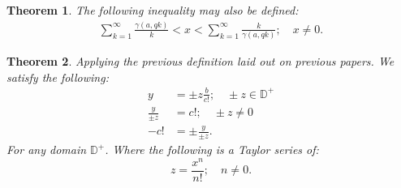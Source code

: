 \documentclass[10pt]{article}
\theoremstyle{plain}
\newtheorem{theorem}{Theorem}[section]
\theoremstyle{definition}
\theoremstyle{remark}
\begin{document}
	\begin{theorem}
		The following inequality may also be defined:
		\begin{align*}
			\sum_{k=1}^{\infty} \frac{\gamma(a, qk)}{k} < x < \sum_{k=1}^{\infty} \frac{k}{\gamma(a, qk)}; \quad x \neq 0.
		\end{align*}
	\end{theorem}
	
	\begin{theorem}
		Applying the previous definition laid out on previous papers. We satisfy the following:
		\begin{align*}
			y &= \pm z \frac{b}{c!}; \quad \pm z \in \mathbb{D}^{+}\\
			\frac{y}{\pm z} &= c!; \quad \pm z \neq 0\\
			-c! &= \pm \frac{y}{\pm z}.
		\end{align*}
		For any domain $\mathbb{D}^{+}$. Where the following is a Taylor series of:
		\begin{equation}
			z = \frac{x^n}{n!}; \quad n \neq 0.
		\end{equation}
	\end{theorem}
	
\end{document}
